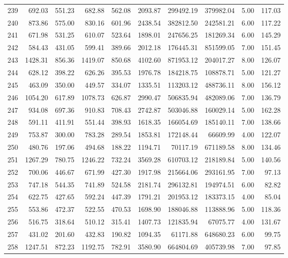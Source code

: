 \begin{tabular}{lrrrrrrrrr}
239 & 692.03 & 551.23 & 682.88 & 562.08 & 2093.87 & 299492.19 & 379982.04 & 5.00 & 117.03 \\
240 & 873.86 & 575.00 & 830.16 & 601.96 & 2438.54 & 382812.50 & 242581.21 & 6.00 & 117.22 \\
241 & 671.98 & 531.25 & 610.07 & 523.64 & 1898.01 & 247656.25 & 181269.34 & 6.00 & 145.29 \\
242 & 584.43 & 431.05 & 599.41 & 389.66 & 2012.18 & 176445.31 & 851599.05 & 7.00 & 151.45 \\
243 & 1428.31 & 856.36 & 1419.07 & 850.68 & 4102.60 & 871953.12 & 204017.27 & 8.00 & 126.07 \\
244 & 628.12 & 398.22 & 626.26 & 395.53 & 1976.78 & 184218.75 & 108878.71 & 5.00 & 121.27 \\
245 & 463.09 & 350.00 & 449.57 & 334.07 & 1335.51 & 113203.12 & 488736.11 & 8.00 & 156.12 \\
246 & 1054.20 & 617.89 & 1078.73 & 626.87 & 2990.47 & 506835.94 & 482089.06 & 7.00 & 136.79 \\
247 & 934.08 & 697.36 & 910.83 & 708.43 & 2742.87 & 503046.88 & 160029.14 & 5.00 & 162.28 \\
248 & 591.11 & 411.91 & 551.44 & 398.93 & 1618.35 & 166054.69 & 185140.11 & 7.00 & 138.66 \\
249 & 753.87 & 300.00 & 783.28 & 289.54 & 1853.81 & 172148.44 & 66609.99 & 4.00 & 122.07 \\
250 & 480.76 & 197.06 & 494.68 & 188.22 & 1194.71 & 70117.19 & 671189.58 & 8.00 & 134.46 \\
251 & 1267.29 & 780.75 & 1246.22 & 732.24 & 3569.28 & 610703.12 & 218189.84 & 5.00 & 140.56 \\
252 & 700.06 & 446.67 & 671.99 & 427.30 & 1917.98 & 215664.06 & 293161.95 & 7.00 & 97.13 \\
253 & 747.18 & 544.35 & 741.89 & 524.58 & 2181.74 & 296132.81 & 194974.51 & 6.00 & 82.82 \\
254 & 622.75 & 427.65 & 592.24 & 447.39 & 1791.21 & 201953.12 & 183373.15 & 4.00 & 85.04 \\
255 & 553.86 & 472.37 & 522.55 & 470.53 & 1698.90 & 188046.88 & 113888.96 & 5.00 & 118.36 \\
256 & 516.75 & 318.64 & 510.12 & 315.41 & 1407.73 & 121835.94 & 67075.77 & 4.00 & 131.67 \\
257 & 431.02 & 201.60 & 432.83 & 190.82 & 1094.35 & 61171.88 & 648680.23 & 6.00 & 99.75 \\
258 & 1247.51 & 872.23 & 1192.75 & 782.91 & 3580.90 & 664804.69 & 405739.98 & 7.00 & 97.85 \\

\end{tabular}

